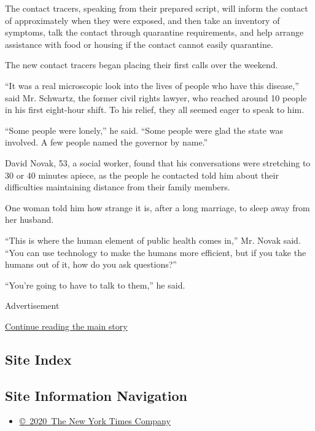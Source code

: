 The contact tracers, speaking from their prepared script, will inform
the contact of approximately when they were exposed, and then take an
inventory of symptoms, talk the contact through quarantine requirements,
and help arrange assistance with food or housing if the contact cannot
easily quarantine.

The new contact tracers began placing their first calls over the
weekend.

``It was a real microscopic look into the lives of people who have this
disease,'' said Mr. Schwartz, the former civil rights lawyer, who
reached around 10 people in his first eight-hour shift. To his relief,
they all seemed eager to speak to him.

``Some people were lonely,'' he said. ``Some people were glad the state
was involved. A few people named the governor by name.''

David Novak, 53, a social worker, found that his conversations were
stretching to 30 or 40 minutes apiece, as the people he contacted told
him about their difficulties maintaining distance from their family
members.

One woman told him how strange it is, after a long marriage, to sleep
away from her husband.

``This is where the human element of public health comes in,'' Mr. Novak
said. ``You can use technology to make the humans more efficient, but if
you take the humans out of it, how do you ask questions?''

``You're going to have to talk to them,'' he said.

Advertisement

\protect\hyperlink{after-bottom}{Continue reading the main story}

\hypertarget{site-index}{%
\subsection{Site Index}\label{site-index}}

\hypertarget{site-information-navigation}{%
\subsection{Site Information
Navigation}\label{site-information-navigation}}

\begin{itemize}
\tightlist
\item
  \href{https://help.nytimes.com/hc/en-us/articles/115014792127-Copyright-notice}{©~2020~The
  New York Times Company}
\end{itemize}

